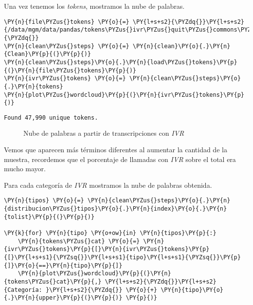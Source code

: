  Una vez tenemos los \textit{tokens}, mostramos la nube de palabras.

\vspace{0.5cm}
    \begin{tcolorbox}[breakable, size=fbox, boxrule=1pt, pad at break*=1mm,colback=cellbackground, colframe=cellborder]
\begin{Verbatim}[commandchars=\\\{\}]
\PY{n}{file\PYZus{}tokens} \PY{o}{=} \PY{l+s+s2}{\PYZdq{}}\PY{l+s+s2}{/data/mgm/data/pandas/tokens\PYZus{}ivr\PYZus{}quit\PYZus{}commons\PYZus{}02112019.pkl}\PY{l+s+s2}{\PYZdq{}}
\PY{n}{clean\PYZus{}steps} \PY{o}{=} \PY{n}{clean}\PY{o}{.}\PY{n}{Clean}\PY{p}{(}\PY{p}{)}
\PY{n}{clean\PYZus{}steps}\PY{o}{.}\PY{n}{load\PYZus{}tokens}\PY{p}{(}\PY{n}{file\PYZus{}tokens}\PY{p}{)}
\PY{n}{ivr\PYZus{}tokens} \PY{o}{=} \PY{n}{clean\PYZus{}steps}\PY{o}{.}\PY{n}{tokens}
\PY{n}{plot\PYZus{}wordcloud}\PY{p}{(}\PY{n}{ivr\PYZus{}tokens}\PY{p}{)}
\end{Verbatim}
\end{tcolorbox}

    \begin{Verbatim}[commandchars=\\\{\}]
Found 47,990 unique tokens.
    \end{Verbatim}


\begin{figure}[!ht]
	\centering
    \caption{Nube de palabras a partir de transcripciones con \textit{IVR}}
    \label{fig:cloudivr}
\end{figure} 

    
    Vemos que aparecen más términos diferentes al aumentar la cantidad de la muestra, recordemos que el porcentaje de llamadas con \textit{IVR} sobre el total era mucho mayor. 
    
    
Para cada categoría de \textit{IVR} mostramos la nube de palabras obtenida.

\vspace{0.5cm}

    \begin{tcolorbox}[breakable, size=fbox, boxrule=1pt, pad at break*=1mm,colback=cellbackground, colframe=cellborder]
\begin{Verbatim}[commandchars=\\\{\}]
\PY{n}{tipos} \PY{o}{=} \PY{n}{clean\PYZus{}steps}\PY{o}{.}\PY{n}{distribucion\PYZus{}tipos}\PY{o}{.}\PY{n}{index}\PY{o}{.}\PY{n}{tolist}\PY{p}{(}\PY{p}{)}

\PY{k}{for} \PY{n}{tipo} \PY{o+ow}{in} \PY{n}{tipos}\PY{p}{:}
    \PY{n}{tokens\PYZus{}cat} \PY{o}{=} \PY{n}{ivr\PYZus{}tokens}\PY{p}{[}\PY{n}{ivr\PYZus{}tokens}\PY{p}{[}\PY{l+s+s1}{\PYZsq{}}\PY{l+s+s1}{tipo}\PY{l+s+s1}{\PYZsq{}}\PY{p}{]}\PY{o}{==}\PY{n}{tipo}\PY{p}{]}
    \PY{n}{plot\PYZus{}wordcloud}\PY{p}{(}\PY{n}{tokens\PYZus{}cat}\PY{p}{,} \PY{l+s+s2}{\PYZdq{}}\PY{l+s+s2}{Categoría: }\PY{l+s+s2}{\PYZdq{}} \PY{o}{+} \PY{n}{tipo}\PY{o}{.}\PY{n}{upper}\PY{p}{(}\PY{p}{)} \PY{p}{)}
\end{Verbatim}
\end{tcolorbox}

